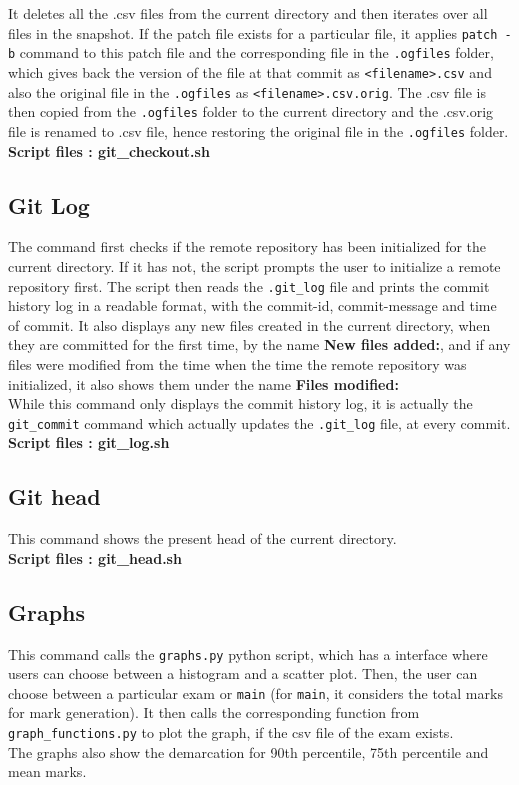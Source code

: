 \documentclass{article}
\begin{document}
It deletes all the .csv files from the current directory and then iterates over all files in the snapshot. If the patch file exists for a particular file, it applies \verb"patch -b" command to this patch file and the corresponding file in the \verb".ogfiles" folder, which gives back the version of the file at that commit as \verb"<filename>.csv" and also the original file in the \verb".ogfiles" as \verb"<filename>.csv.orig".
The .csv file is then copied from the \verb".ogfiles" folder to the current directory and the .csv.orig file is renamed to .csv file, hence restoring the original file in the \verb".ogfiles" folder.\\

\textbf{Script files : git\_checkout.sh}

\subsection{Git Log}
The command first checks if the remote repository has been initialized for the current directory. If it has not, the script prompts the user to initialize a remote repository first.
The script then reads the \verb".git_log" file and prints the commit history log in a readable format, with the commit-id, commit-message and time of commit. It also displays any new files created in the current directory, when they are committed for the first time, by the name \textbf{New files added:}, and if any files were modified from the time when the time the remote repository was initialized, it also shows them under the name \textbf{Files modified:} \\

While this command only displays the commit history log, it is actually the \verb"git_commit" command which actually updates the \verb".git_log" file, at every commit.\\

\textbf{Script files : git\_log.sh}
\subsection{Git head}
This command shows the present head of the current directory.\\

\textbf{Script files : git\_head.sh}


\subsection{Graphs}
This command calls the \verb"graphs.py" python script, which has a interface where users can choose between a histogram and a scatter plot. Then, the user can choose between a particular exam or \verb"main" (for \verb"main", it considers the total marks for mark generation). It then calls the corresponding function from \verb"graph_functions.py" to plot the graph, if the csv file of the exam exists.\\
The graphs also show the demarcation for 90th percentile, 75th percentile and mean marks.\\
\end{document}
